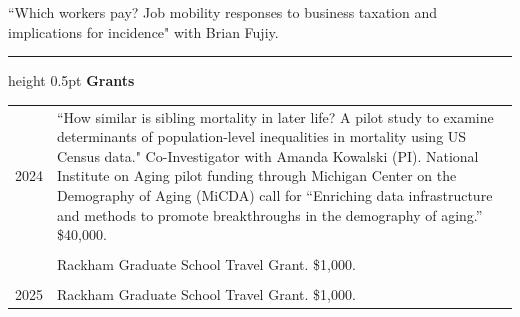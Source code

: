 \documentclass[a4paper,11pt]{article}
\newcommand{\CVSection}[1]{%
  \vspace{1.5em}
  \hrule height 0.5pt
  \vspace{0.8em}
  \noindent\textbf{#1}
  \vspace{0.5em}\par
}
\begin{document}
``Which workers pay? Job mobility responses to business taxation and implications for incidence" with Brian Fujiy.


\newpage
\CVSection{Grants}

\begin{tabularx}{\linewidth}{@{}lX@{}}
 2024    &  ``How similar is sibling mortality in later life? A pilot study to examine determinants of population-level inequalities in mortality using US Census data." Co-Investigator with Amanda Kowalski (PI). National Institute on Aging pilot funding through Michigan Center on the Demography of Aging (MiCDA) call for ``Enriching data infrastructure and methods to promote breakthroughs in the demography of aging.” \$40,000. \\
        & \\
         &  Rackham Graduate School Travel Grant. \$1,000. \\ 

         & \\

2025    & Rackham Graduate School Travel Grant. \$1,000.
\end{tabularx}





\end{document}
